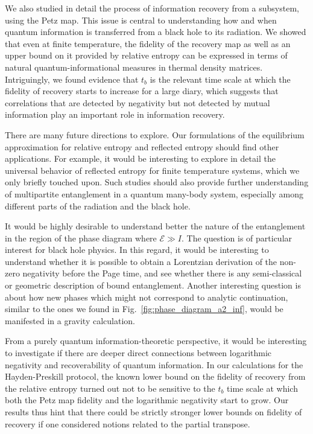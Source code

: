 \documentclass[a4paper,11pt]{article}
\newcommand\sE{{\ensuremath{{\mathcal E}}}}
\begin{document}
\begin{enumerate}
We also studied in detail the process of information recovery from a subsystem, using the Petz map. This issue is central to understanding how and when quantum information is transferred from a black hole to its radiation. We showed that even at finite temperature, the fidelity of the recovery map as well as an upper bound on it provided by relative entropy can 
be expressed in terms of natural quantum-informational measures in thermal density matrices. Intriguingly, we found evidence that $t_b$ is the relevant time scale at which the fidelity of recovery starts to increase for a large diary, which suggests that correlations that are detected by negativity but not detected by mutual information play an important role in information recovery.

There are many future directions to explore. Our formulations of the equilibrium approximation for relative entropy and reflected entropy should find other applications. For example, it would be interesting to explore in detail the universal behavior of reflected entropy for finite temperature systems, which we only briefly touched upon. Such studies should also 
provide further understanding of multipartite entanglement in a quantum many-body system, especially 
among different parts of the radiation and the black hole. 

It would be highly desirable to understand better the nature of the entanglement in the region of the phase diagram where $\sE \gg I$. The question is of particular interest for black hole physics. In this regard, it would be interesting to understand whether it is possible to obtain a Lorentzian derivation of the non-zero negativity before the Page time, and see whether there is any semi-classical or geometric description of bound entanglement. Another interesting question is about how new phases which might not correspond to analytic continuation, similar to the ones we found in Fig.~\ref{fig:phase_diagram_a2_inf}, would be manifested in a gravity calculation.

From a purely quantum information-theoretic perspective, it would be interesting to investigate if there are deeper direct connections between logarithmic negativity and recoverability of quantum information.  In our calculations for the Hayden-Preskill protocol, the known lower bound on the fidelity of recovery from the relative entropy turned out not to be sensitive to the $t_b$ time scale at which both the Petz map fidelity and the logarithmic negativity start to grow. Our results thus hint that there could be strictly stronger lower bounds on fidelity of recovery if one considered notions related to the partial transpose.




\end{enumerate}
\end{document}
